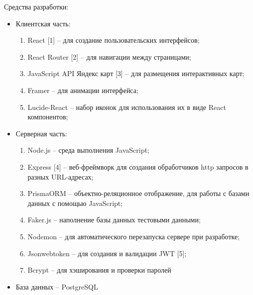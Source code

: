 \documentclass[14pt]{article}
\begin{document}
Средства разработки:
\begin{itemize}
	\item Клиентская часть:
	      \begin{enumerate}
		      \item React [1] – для создание пользовательских интерфейсов;
		      \item React Router [2] – для навигации между страницами;
		      \item JavaScript API Яндекс карт [3] – для размещения интерактивных карт;
		      \item Framer – для анимации интерфейса;
		      \item Lucide-React – набор иконок для использования их в виде React компонентов;
	      \end{enumerate}
	\item Серверная часть:
	      \begin{enumerate}
		      \item Node.js – среда выполнения JavaScript;
		      \item Express [4] – веб-фреймворк для создания обработчиков http запросов в разных
		            URL-адресах;
		      \item PrismaORM – объектно-реляционное отображение, для работы с базами данных с
		            помощью JavaScript;
		      \item Faker.js – наполнение базы данных тестовыми данными;
		      \item Nodemon – для автоматического перезапуска сервере при разработке;
		      \item Jsonwebtoken – для создания и валидации JWT [5];
		      \item Bcrypt – для хэширования и проверки паролей
	      \end{enumerate}
	\item База данных – PostgreSQL
\end{itemize}
\newpage
\end{document}
